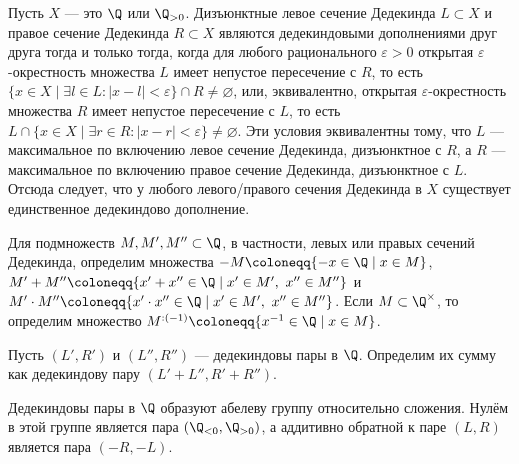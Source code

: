 \documentclass[
	extrafontsizes,
	11pt,
	hyphens,
]{memoir}
\begin{document}
\begin{observation}
Пусть \(X\) --- это \(\Q\) или \(\Q_{>0}\).
Дизъюнктные левое сечение Дедекинда \(L \subset X\) и правое сечение Дедекинда \(R \subset X\) являются дедекиндовыми дополнениями друг друга тогда и только тогда, когда для любого рационального \(\varepsilon > 0\) открытая \(\varepsilon\)-окрестность множества \(L\) имеет непустое пересечение с \(R\),
то есть
\(\{x \in X \mid \exists l \in L : |x-l| < \varepsilon\} \cap R \neq \varnothing\),
или, эквивалентно,
открытая \(\varepsilon\)-окрестность множества \(R\) имеет непустое пересечение с \(L\),
то есть
\(L \cap \{x \in X \mid \exists r \in R : |x-r| < \varepsilon\} \neq \varnothing\).
Эти условия эквивалентны тому, что \(L\) --- максимальное по включению левое сечение Дедекинда, дизъюнктное с \(R\), а \(R\) --- максимальное по включению правое сечение Дедекинда, дизъюнктное с \(L\).
Отсюда следует, что у любого ле\-во\-го/пра\-во\-го сечения Дедекинда в \(X\) существует единственное дедекиндово дополнение.
\end{observation}

\begin{definition}
Для подмножеств \(M, M', M'' \subset \Q\),
в частности, левых или правых сечений Дедекинда,
определим множества
\(-M \coloneqq \{-x \in \Q \mid x \in M\}\),
\(M' + M'' \coloneqq \{x' + x'' \in \Q \mid x' \in M',\ x'' \in M''\}\) и
\(M' \cdot M'' \coloneqq \{x' \cdot x'' \in \Q \mid x' \in M',\ x'' \in M''\}\).
Если \(M \subset \Q^\times\), то определим множество
\(M^{:(-1)} \coloneqq \{x^{-1} \in \Q \mid x \in M\}\).
\end{definition}

\begin{definition}
Пусть \((L',R')\) и \((L'',R'')\) --- дедекиндовы пары в \(\Q\).
Определим их сумму как дедекиндову пару
\((L' + L'', R' + R'')\).
\end{definition}

\begin{observation}
Дедекиндовы пары в \(\Q\) образуют абелеву группу относительно сложения.
\label{obs:DedPairAddGr}
Нулём в этой группе является пара
\((\Q_{<0}, \Q_{>0})\),
а аддитивно обратной к паре \((L,R)\) является пара \((-R,-L)\).
\end{observation}
\end{document}
